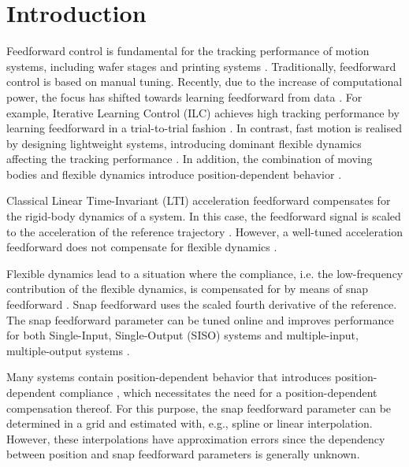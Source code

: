 \documentclass[letterpaper, 10 pt, conference]{ieeeconf}  %
\newcounter{example}
\begin{document}
\section{Introduction}
Feedforward control is fundamental for the tracking performance of motion systems, including wafer stages \cite{deRozario2017b} and printing systems \cite{Bolder2014}. Traditionally, feedforward control is based on manual tuning. Recently, due to the increase of computational power, the focus has shifted towards learning feedforward from data \cite{Oomen2020}. For example, Iterative Learning Control (ILC) achieves high tracking performance by learning feedforward in a trial-to-trial fashion \cite{Bristow2006}. In contrast, fast motion is realised by designing lightweight systems, introducing dominant flexible dynamics affecting the tracking performance \cite{Ronde2014}. In addition, the combination of moving bodies and flexible dynamics introduce position-dependent behavior \cite{deSilva2007,Voorhoeve2021}. \par 
Classical Linear Time-Invariant (LTI) acceleration feedforward compensates for the rigid-body dynamics of a system. In this case, the feedforward signal is scaled to the acceleration of the reference trajectory \cite{Oomen2019}. However, a well-tuned acceleration feedforward does not compensate for flexible dynamics \cite{Boerlage2004}. \par
Flexible dynamics lead to a situation where the compliance, i.e. the low-frequency contribution of the flexible dynamics, is compensated for by means of snap feedforward \cite{Boerlage2004}. Snap feedforward uses the scaled fourth derivative of the reference. The snap feedforward parameter can be tuned online and improves performance for both Single-Input, Single-Output (SISO) systems \cite{Boerlage2004} and multiple-input, multiple-output systems \cite{Boerlage2006}.\par
Many systems contain position-dependent behavior that introduces position-dependent compliance \cite{Voorhoeve2016,deRozario2021,Kontaras2016}, which necessitates the need for a position-dependent compensation thereof. For this purpose, the snap feedforward parameter can be determined in a grid and estimated with, e.g., spline or linear interpolation. However, these interpolations have approximation errors since the dependency between position and snap feedforward parameters is generally unknown. \par
\end{document}
